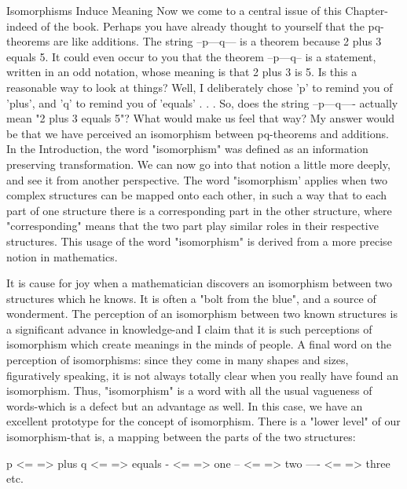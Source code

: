 Isomorphisms Induce Meaning Now we come to a central issue of this Chapter-indeed of the book. Perhaps you have already thought to yourself that the pq-theorems are like additions. The string --p---q--- is a theorem because 2 plus 3 equals 5. It could even occur to you that the theorem --p---q-- is a statement, written in an odd notation, whose meaning is that 2 plus 3 is 5. Is this a reasonable way to look at things? Well, I deliberately chose 'p' to remind you of 'plus', and 'q' to remind you of 'equals' . . . So, does the string --p---q---- actually mean "2 plus 3 equals 5"? What would make us feel that way? My answer would be that we have perceived an isomorphism between pq-theorems and additions. In the Introduction, the word "isomorphism" was defined as an information preserving transformation. We can now go into that notion a little more deeply, and see it from another perspective. The word "isomorphism' applies when two complex structures can be mapped onto each other, in such a way that to each part of one structure there is a corresponding part in the other structure, where "corresponding" means that the two part play similar roles in their respective structures. This usage of the word "isomorphism" is derived from a more precise notion in mathematics. 







It is cause for joy when a mathematician discovers an isomorphism between two structures which he knows. It is often a "bolt from the blue", and a source of wonderment. The perception of an isomorphism between two known structures is a significant advance in knowledge-and I claim that it is such perceptions of isomorphism which create meanings in the minds of people. A final word on the perception of isomorphisms: since they come in many shapes and sizes, figuratively speaking, it is not always totally clear when you really have found an isomorphism. Thus, "isomorphism" is a word with all the usual vagueness of words-which is a defect but an advantage as well. In this case, we have an excellent prototype for the concept of isomorphism. There is a "lower level" of our isomorphism-that is, a mapping between the parts of the two structures: 

p <= => plus q <= => equals - <= => one -- <= => two ---- <= => three etc. 

